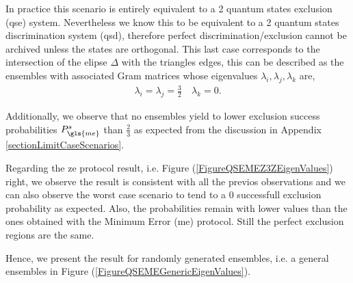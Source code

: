 \documentclass[12pt,letterpaper]{article}
\begin{document}
In practice this scenario is entirely equivalent to a 2 quantum states exclusion (\gls{qse}) system. Nevertheless we know this to be equivalent to a 2 quantum states discrimination system (\gls{qsd}), therefore perfect discrimination/exclusion cannot be archived unless the states are orthogonal. This last case corresponds to the intersection of the elipse $\Delta$ with the triangles edges, this can be described as the ensembles with associated Gram matrices whose eigenvalues $\lambda_i,\lambda_j,\lambda_k$ are,
\begin{align*}
	\lambda_i=\lambda_j=\frac{3}{2}\quad\lambda_k=0.
\end{align*}

Additionally, we observe that no ensembles yield to lower exclusion success probabilities $P_{\gls{me}}^s$ than $\frac{2}{3}$ as expected from the discussion in Appendix \ref{sectionLimitCaseScenarios}.




Regarding the \gls{ze} protocol result, i.e. Figure (\ref{FigureQSEMEZ3ZEigenValues}) right, we observe the result is consistent with all the previos observations and we can also observe the worst case scenario to tend to a 0 successfull exclusion probability as expected. Also, the probabilities remain with lower values than the ones obtained with the Minimum Error (\gls{me}) protocol. Still the perfect exclusion regions are the same.

Hence, we present the result for randomly generated ensembles, i.e. a general ensembles  in Figure (\ref{FigureQSEMEGenericEigenValues}).
\end{document}
